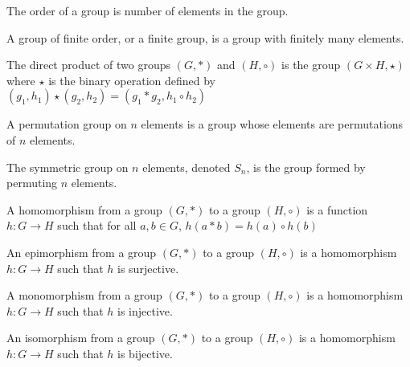 \documentclass[crop=false,class=book,oneside]{standalone}
\begin{document}
            \begin{definition}
                The order of a group is number of elements in the
                group.
            \end{definition}
            \begin{definition}
                A group of finite order, or a finite group,
                is a group with finitely many elements.
            \end{definition}
            \begin{definition}
                The direct product of two groups $(G,*)$ and
                $(H,\circ)$ is the group  $({G}\times{H},\star)$
                where $\star$ is the binary operation defined by
                $(g_{1},h_{1})\star(g_{2},h_{2})%
                 =(g_{1}*g_{2},{h_{1}}\circ{h_{2}})$
            \end{definition}
            \begin{definition}
                A permutation group on $n$ elements is a
                group whose elements are permutations of
                $n$ elements.
            \end{definition}
            \begin{definition}
                The symmetric group on $n$ elements,
                denoted $S_{n}$, is the group formed by
                permuting $n$ elements.
            \end{definition}
            \begin{definition}
                A homomorphism from a group $(G,*)$ to
                a group $(H,\circ)$ is a function
                $h:{G}\rightarrow{H}$ such that for all
                ${a,b}\in{G}$, $h(a*b)={h(a)}\circ{h(b)}$
            \end{definition}
            \begin{definition}
                An epimorphism from a group $(G,*)$ to
                a group $(H,\circ)$ is a homomorphism
                $h:{G}\rightarrow{H}$ such that
                $h$ is surjective.
            \end{definition}
            \begin{definition}
                A monomorphism from a group $(G,*)$ to
                a group $(H,\circ)$ is a homomorphism
                $h:{G}\rightarrow{H}$ such that
                $h$ is injective.
            \end{definition}
            \begin{definition}
                An isomorphism from a group $(G,*)$ to
                a group $(H,\circ)$ is a homomorphism
                $h:{G}\rightarrow{H}$ such that
                $h$ is bijective.
            \end{definition}
\end{document}
